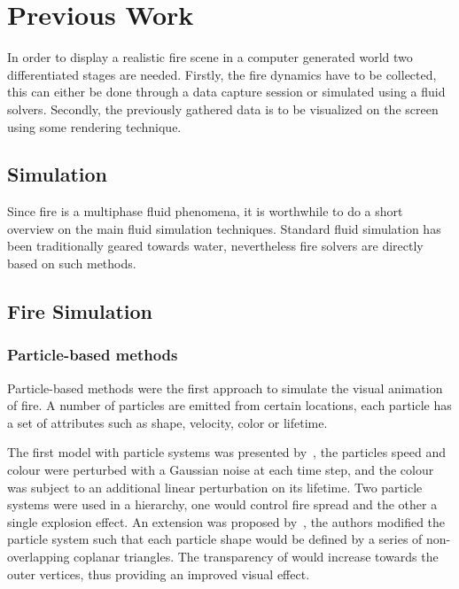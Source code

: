 \chapter{Previous Work}
\label{ch:previous_work}

In order to display a realistic fire scene in a computer generated world two differentiated stages are needed.
Firstly, the fire dynamics have to be collected, this can either be done through a data capture session or simulated using a fluid solvers.
Secondly, the previously gathered data is to be visualized on the screen using some rendering technique.

\section{Simulation}
\label{sec:simulation}

Since fire is a multiphase fluid phenomena, it is worthwhile to do a short overview on the main fluid simulation techniques.
Standard fluid simulation has been traditionally geared towards water, nevertheless fire solvers are directly based on such methods.

\section{Fire Simulation}
\label{sec:fire_simulation}

\subsection{Particle-based methods}

Particle-based methods were the first approach to simulate the visual animation of fire.
A number of particles are emitted from certain locations, each particle has a set of attributes such as shape, velocity, color or lifetime.

The first model with particle systems was presented by~\cite{Reeves:1983}, the particles speed and colour were perturbed with a Gaussian noise at each time step, and the colour was subject to an additional linear perturbation on its lifetime.
Two particle systems were used in a hierarchy, one would control fire spread and the other a single explosion effect.
An extension was proposed by~\cite{Perry:1994}, the authors modified the particle system such that each particle shape would be defined by a series of non-overlapping coplanar triangles.
The transparency of would increase towards the outer vertices, thus providing an improved visual effect.

